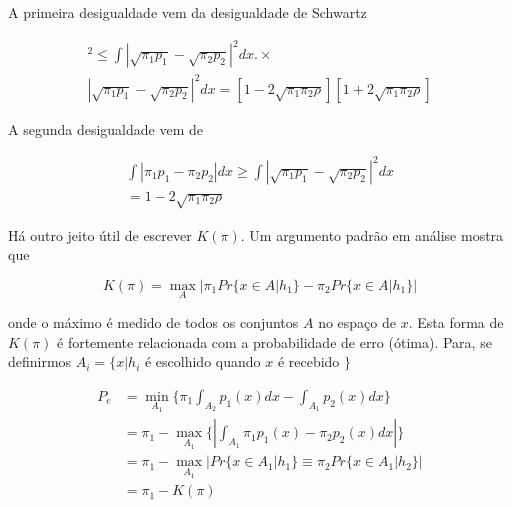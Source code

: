 \documentclass{sbrt2017port}
\begin{document}
A primeira desigualdade vem da desigualdade de Schwartz

\begin{align*}
	[\int {|\pi_1p_1-\pi_2p_2|dx}]^2 \leq \int {|\sqrt{\pi_1p_1} - \sqrt{\pi_2p_2}|}^2dx. \times \\
	{|\sqrt{\pi_1p_1} - \sqrt{\pi_2p_2}|}^2dx = [1 - 2\sqrt{\pi_1\pi_2\rho}][1 + 2\sqrt{\pi_1\pi_2\rho}]
\end{align*}

A segunda desigualdade vem de 

\begin{align*}
	\int {|\pi_1p_1-\pi_2p_2|dx} \geq \int {|\sqrt{\pi_1p_1} - \sqrt{\pi_2p_2}|}^2dx \\
	= 1 - 2\sqrt{\pi_1\pi_2\rho}
\end{align*}

Há outro jeito útil de escrever $K(\pi)$. Um argumento padrão em análise mostra que

\begin{equation}
	K(\pi) = \max_A |\pi_1Pr\{x \in A|h_1\}-\pi_2Pr\{x \in A|h_1\}|
	\label{eq46}
\end{equation}

onde o 	máximo é medido de todos os conjuntos $A$ no espaço de $x$. Esta forma de $K(\pi)$ é fortemente relacionada com a probabilidade de erro (ótima). Para, se definirmos $A_i = \{x | h_i$ é escolhido quando $x$ é recebido $\}$

\begin{equation} \label{eq47}
	\begin{split}
	P_e & = \min_{A_1} \{ \pi_1 \int_{A_2} p_1(x)dx - \int_{A_1} p_2(x)dx \} \\
	& = \pi_1 - \max_{A_1} \{ | \int_{A_1} \pi_1p_1(x) - \pi_2p_2(x)dx| \} \\
	& = \pi_1 - \max_{A_1} |Pr\{x \in A_1|h_1\} \equiv \pi_2Pr\{x \in A_1|h_2\} | \\
	& = \pi_1 - K(\pi)
	\end{split}
\end{equation}
\end{document}
